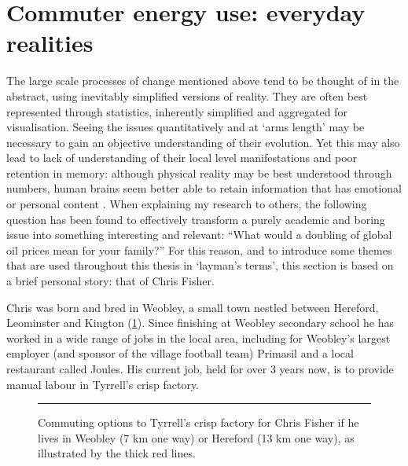 \documentclass[a4paper, 11pt, twoside]{Thesis}
\begin{document}
\section{Commuter energy use: everyday realities}
\label{s:realities}
The large scale processes of change mentioned above tend to be thought of in the
abstract, using inevitably simplified versions of reality. They are
often best represented through statistics, inherently simplified and
aggregated for visualisation. Seeing the issues quantitatively and
at `arms length' may be necessary to
gain an objective understanding of their evolution. Yet this may also lead to lack
of understanding of their local level manifestations and poor retention in memory:
although physical
reality may be best understood through numbers, human brains seem better able to
retain information that has emotional or personal content
\citep{Laird1982, Green2012}.
When explaining my research to others, the following question
has been found to
effectively transform a purely academic and boring issue into something
interesting and relevant:
``What would a doubling of global oil prices mean for your family?''
For this reason, and to introduce some themes that
are used throughout this thesis in `layman's terms', this section is
based on a brief personal story: that of Chris Fisher.

Chris was born and bred in Weobley, a small town nestled between Hereford,
Leominster and Kington (\cref{fig:hereford}). Since finishing
at Weobley secondary school he has worked in a
wide range of jobs in the local area, including for Weobley's largest employer
(and sponsor of the village football team) Primasil and a local restaurant
called Joules. His current job, held for over 3 years now, is
to provide manual labour in Tyrrell's crisp factory.

\begin{figure}[htbp]
  \centerline{
    }
    \rule{35em}{0.5pt}
  \caption[Commuting options to Tyrrell's crisp factory]{Commuting options to
Tyrrell's crisp factory for Chris Fisher if he lives in Weobley (7 km one way)
or Hereford (13 km one way), as illustrated by the thick red lines.}
  \label{fig:hereford}
\end{figure}
\end{document}

